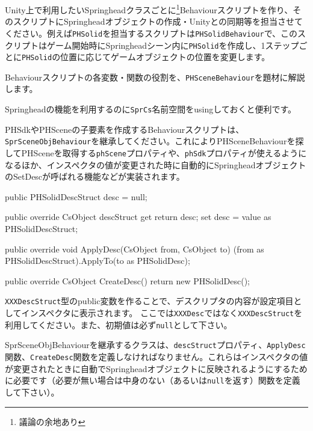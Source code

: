 Unity上で利用したいSpringheadクラスごとに\footnote{議論の余地あり}Behaviourスクリプトを作り、そのスクリプトにSpringheadオブジェクトの作成・Unityとの同期等を担当させてください。例えば\texttt{PHSolid}を担当するスクリプトは\texttt{PHSolidBehaviour}で、このスクリプトはゲーム開始時にSpringheadシーン内に\texttt{PHSolid}を作成し、1ステップごとに\texttt{PHSolid}の位置に応じてゲームオブジェクトの位置を変更します。

Behaviourスクリプトの各変数・関数の役割を、\texttt{PHSceneBehaviour}を題材に解説します。

\begin{sourcecode}
using UnityEngine;
using SprCs;

public class PHSolidBehaviour : SprSceneObjBehaviour {
\end{sourcecode}

Springheadの機能を利用するのに\texttt{SprCs}名前空間をusingしておくと便利です。

PHSdkやPHSceneの子要素を作成するBehaviourスクリプトは、\texttt{SprSceneObjBehaviour}を継承してください。これによりPHSceneBehaviourを探してPHSceneを取得する\texttt{phScene}プロパティや、\texttt{phSdk}プロパティが使えるようになるほか、インスペクタの値が変更された時に自動的にSpringheadオブジェクトのSetDescが呼ばれる機能などが実装されます。

\begin{sourcecode}
    public PHSolidDescStruct desc = null;

    public override CsObject descStruct {
        get { return desc; }
        set { desc = value as PHSolidDescStruct; }
    }

    public override void ApplyDesc(CsObject from, CsObject to) {
        (from as PHSolidDescStruct).ApplyTo(to as PHSolidDesc);
    }

    public override CsObject CreateDesc() {
        return new PHSolidDesc();
    }
\end{sourcecode}

\texttt{XXXDescStruct}型のpublic変数を作ることで、デスクリプタの内容が設定項目としてインスペクタに表示されます。
\KLUDGE ここでは\texttt{XXXDesc}ではなく\texttt{XXXDescStruct}を利用してください。また、初期値は必ず\texttt{null}として下さい。

SprSceneObjBehaviourを継承するクラスは、\texttt{descStruct}プロパティ、\texttt{ApplyDesc}関数、\texttt{CreateDesc}関数を定義しなければなりません。これらはインスペクタの値が変更されたときに自動でSpringheadオブジェクトに反映されるようにするために必要です（必要が無い場合は中身のない（あるいは\texttt{null}を返す）関数を定義して下さい）。

